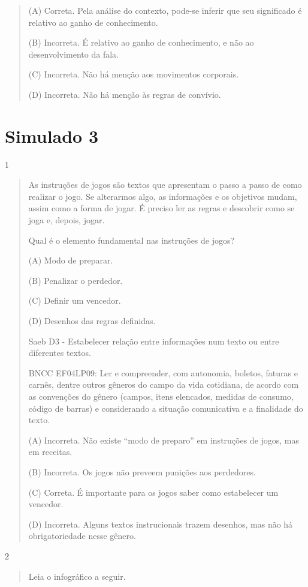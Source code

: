\begin{escolha}
\begin{quote}
(A) Correta. Pela análise do contexto, pode-se inferir que seu
significado é relativo ao ganho de conhecimento.

(B) Incorreta. É relativo ao ganho de conhecimento, e não ao
desenvolvimento da fala.

(C) Incorreta. Não há menção aos movimentos corporais.

(D) Incorreta. Não há menção às regras de convívio.
\end{quote}

\chapter{Simulado 3}

\num{1}

\begin{quote}
As instruções de jogos são textos que apresentam o passo a passo de como
realizar o jogo. Se alterarmos algo, as informações e os objetivos
mudam, assim como a forma de jogar. É preciso ler as regras e descobrir
como se joga e, depois, jogar.

Qual é o elemento fundamental nas instruções de jogos?

(A) Modo de preparar.

(B) Penalizar o perdedor.

(C) Definir um vencedor.

(D) Desenhos das regras definidas.

Saeb D3 - Estabelecer relação entre informações num texto ou entre
diferentes textos.

BNCC EF04LP09: Ler e compreender, com autonomia, boletos, faturas e
carnês, dentre outros gêneros do campo da vida cotidiana, de acordo com
as convenções do gênero (campos, itens elencados, medidas de consumo,
código de barras) e considerando a situação comunicativa e a finalidade
do texto.

(A) Incorreta. Não existe ``modo de preparo'' em instruções de jogos,
mas em receitas.

(B) Incorreta. Os jogos não preveem punições aos perdedores.

(C) Correta. É importante para os jogos saber como estabelecer um
vencedor.

(D) Incorreta. Alguns textos instrucionais trazem desenhos, mas não há
obrigatoriedade nesse gênero.
\end{quote}

\num{2}

\begin{quote}
Leia o infográfico a seguir.


\end{quote}
\end{escolha}
